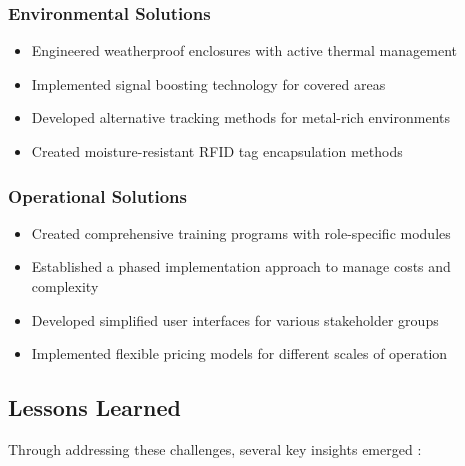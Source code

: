 \documentclass[conference]{IEEEtran}
\begin{document}
\subsubsection{Environmental Solutions}
\begin{itemize}
    \item Engineered weatherproof enclosures with active thermal management \cite{visconti2020development}
    \item Implemented signal boosting technology for covered areas \cite{xu2023novel}
    \item Developed alternative tracking methods for metal-rich environments \cite{rosero2023smart}
    \item Created moisture-resistant RFID tag encapsulation methods \cite{rayhana2021rfid}
\end{itemize}

\subsubsection{Operational Solutions}
\begin{itemize}
    \item Created comprehensive training programs with role-specific modules \cite{tharatipyakul2021user}
    \item Established a phased implementation approach to manage costs and complexity \cite{ahmed2024optimized}
    \item Developed simplified user interfaces for various stakeholder groups \cite{makario2021bluetooth}
    \item Implemented flexible pricing models for different scales of operation \cite{hernandez2024implementation}
\end{itemize}

\subsection{Lessons Learned}
Through addressing these challenges, several key insights emerged \cite{al2021prochain}:
\end{document}
